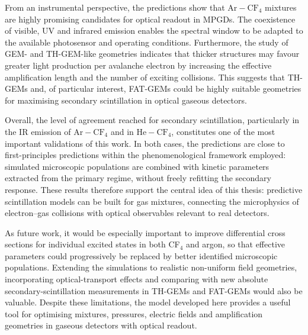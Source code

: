 \documentclass[12pt,a4paper]{article}
\newcommand{\He}{\mathrm{He}}
\newcommand{\Ar}{\mathrm{Ar}}
\newcommand{\CF}{\mathrm{CF}}
\begin{document}
From an instrumental perspective, the predictions show that $\Ar-\CF_4$ mixtures are highly promising candidates for optical readout in MPGDs. The coexistence of visible, UV and infrared emission enables the spectral window to be adapted to the available photosensor and operating conditions. Furthermore, the study of GEM- and TH-GEM-like geometries indicates that thicker structures may favour greater light production per avalanche electron by increasing the effective amplification length and the number of exciting collisions. This suggests that TH-GEMs and, of particular interest, FAT-GEMs could be highly suitable geometries for maximising secondary scintillation in optical gaseous detectors.

Overall, the level of agreement reached for secondary scintillation, particularly in the IR emission of $\Ar-\CF_4$ and in $\He-\CF_4$, constitutes one of the most important validations of this work. In both cases, the predictions are close to first-principles predictions within the phenomenological framework employed: simulated microscopic populations are combined with kinetic parameters extracted from the primary regime, without freely refitting the secondary response. These results therefore support the central idea of this thesis: predictive scintillation models can be built for gas mixtures, connecting the microphysics of electron--gas collisions with optical observables relevant to real detectors.

As future work, it would be especially important to improve differential cross sections for individual excited states in both CF$_4$ and argon, so that effective parameters could progressively be replaced by better identified microscopic populations. Extending the simulations to realistic non-uniform field geometries, incorporating optical-transport effects and comparing with new absolute secondary-scintillation measurements in TH-GEMs and FAT-GEMs would also be valuable. Despite these limitations, the model developed here provides a useful tool for optimising mixtures, pressures, electric fields and amplification geometries in gaseous detectors with optical readout.

\printbibliography
{}
\end{document}
